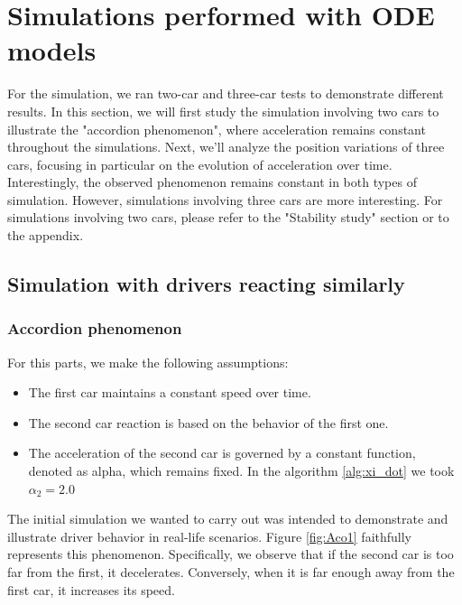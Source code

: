 \documentclass{article}
\begin{document}
		
	
	
	
	
	\section{Simulations performed with ODE models}
	
	For the simulation, we ran two-car and three-car tests to demonstrate different results. In this section, we will first study the simulation involving two cars to illustrate the "accordion phenomenon", where acceleration remains constant throughout the simulations. Next, we'll analyze the position variations of three cars, focusing in particular on the evolution of acceleration over time. Interestingly, the observed phenomenon remains constant in both types of simulation. However, simulations involving three cars are more interesting. For simulations involving two cars, please refer to the "Stability study" section or to the appendix.
	
	\subsection{Simulation with drivers reacting similarly}
		\subsubsection{Accordion phenomenon}
		
		For this parts, we make the following assumptions:
		
		\begin{itemize}
			\item The first car maintains a constant speed over time.
			\item The second car reaction is based on the behavior of the first one.
			\item The acceleration of the second car is governed by a constant function, denoted as alpha, which remains fixed. In the algorithm \ref{alg:xi_dot} we took $\alpha_2=2.0$
		\end{itemize} 
		
		The initial simulation we wanted to carry out was intended to demonstrate and illustrate driver behavior in real-life scenarios. Figure \ref{fig:Aco1} faithfully represents this phenomenon. Specifically, we observe that if the second car is too far from the first, it decelerates. Conversely, when it is far enough away from the first car, it increases its speed.
		
\end{document}
